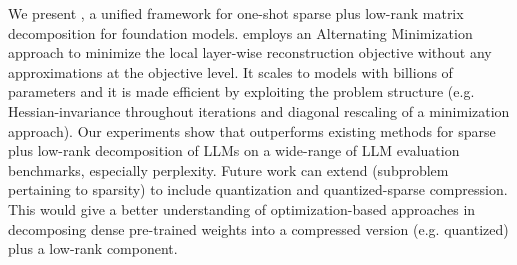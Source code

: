 
We present \ourframework, a unified framework for one-shot sparse plus low-rank matrix decomposition for foundation models. \ourframework employs an Alternating Minimization approach to minimize the local layer-wise reconstruction objective without any approximations at the objective level. It scales to models with billions of parameters and it is made efficient by exploiting the problem structure (e.g. Hessian-invariance throughout iterations and diagonal rescaling of a minimization approach). Our experiments show that \ourframework outperforms existing methods for sparse plus low-rank decomposition of LLMs on a wide-range of LLM evaluation benchmarks, especially perplexity. 
Future work can extend \Pone (subproblem pertaining to sparsity) to include quantization and quantized-sparse compression. This would give a better understanding of optimization-based approaches in decomposing dense pre-trained weights into a compressed version (e.g. quantized) plus a low-rank component.